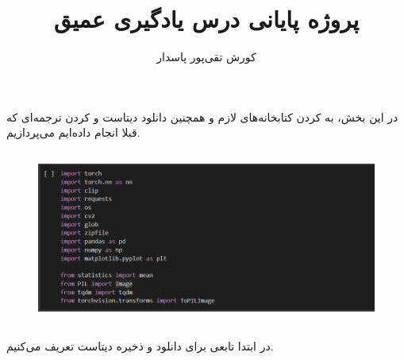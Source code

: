 \documentclass[12pt]{article}
\title{پروژه پایانی درس یادگیری عمیق}
\author{کورش تقی‌پور پاسدار}
\begin{document}
	\maketitle
	\newpage
	\tableofcontents
	\newpage
	\section{}
	در این بخش، به  کردن کتابخانه‌های لازم و همچنین دانلود دیتاست  و  کردن ترجمه‌ای که قبلا انجام داده‌ایم می‌پردازیم.
	\subsection{}
	\begin{figure}[H]
		\centering
		\includegraphics[width=0.9\linewidth]{pic_1}
	\end{figure}
	\subsection{}
	\subsubsection{}
	در ابتدا تابعی برای دانلود و ذخیره دیتاست تعریف می‌کنیم.
	\begin{figure}[H]
		\centering
		\quad \quad
	\end{figure}
\end{document}
